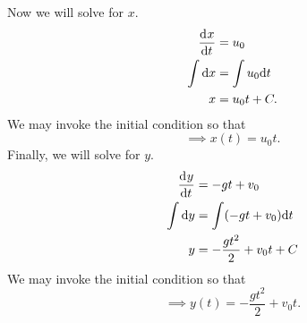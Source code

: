 \documentclass[12pt]{article}
\begin{document}
\begin{enumerate}[(a)]
\begin{equation*}
  \end{equation*}
  Now we will solve for $x$.
  \begin{equation*}
    \begin{aligned}
      \frac{\mathrm{d}^{} {x}}{\mathrm{d}{t}^{}} &= u_0 \\
      \int \mathrm{d}{x} &= \int u_0 \mathrm{d}{t} \\
      x &= u_0t + C. \\
    \end{aligned}
  \end{equation*}
  We may invoke the initial condition so that
  \begin{equation*}
    \implies x(t) = u_0 t.
  \end{equation*}
  Finally, we will solve for $y$.
  \begin{equation*}
    \begin{aligned}
      \frac{\mathrm{d}^{} {y}}{\mathrm{d}{t}^{}} &= -gt + v_0 \\
      \int\mathrm{d}{y} &= \int(-gt + v_0) \mathrm{d}{t} \\
      y &= -\frac{gt^2}{2} + v_0t + C
    \end{aligned}
  \end{equation*}
  We may invoke the initial condition so that
  \begin{equation*}
    \implies y(t) = -\frac{gt^2}{2} + v_0t.
  \end{equation*}
\end{enumerate}
\todo{}
\end{document}
